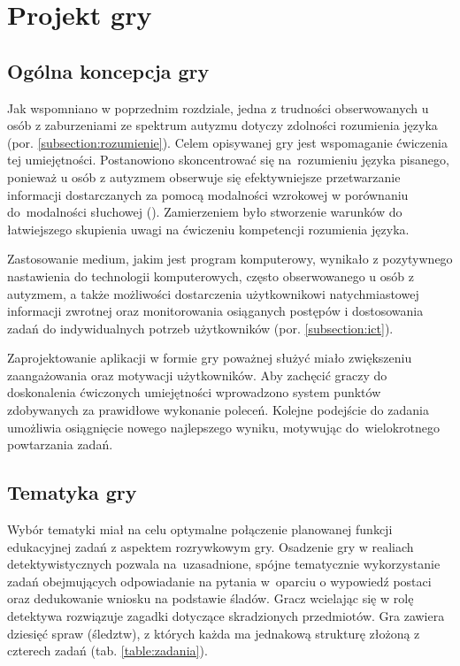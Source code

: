\chapter{Projekt gry}
\thispagestyle{firststyle}

\section{Ogólna koncepcja gry}

    Jak wspomniano w poprzednim rozdziale, jedna z trudności obserwowanych u osób z zaburzeniami ze spektrum autyzmu dotyczy zdolności rozumienia języka (por. \ref{subsection:rozumienie}).
    Celem opisywanej gry jest wspomaganie ćwiczenia tej umiejętności.
    Postanowiono skoncentrować się na~rozumieniu języka pisanego, ponieważ u osób z autyzmem obserwuje się efektywniejsze przetwarzanie informacji dostarczanych za pomocą modalności wzrokowej w porównaniu do~modalności słuchowej (\cite{quill1997instructional}).
    Zamierzeniem było stworzenie warunków do łatwiejszego skupienia uwagi na ćwiczeniu kompetencji rozumienia języka.
    
    Zastosowanie medium, jakim jest program komputerowy, wynikało z pozytywnego nastawienia do technologii komputerowych, często obserwowanego u osób z autyzmem, a także możliwości dostarczenia użytkownikowi natychmiastowej informacji zwrotnej oraz monitorowania osiąganych postępów i dostosowania zadań do indywidualnych potrzeb użytkowników (por. \ref{subsection:ict}).
    
    Zaprojektowanie aplikacji w formie gry poważnej służyć miało zwiększeniu zaangażowania oraz motywacji użytkowników.
    Aby zachęcić graczy do doskonalenia ćwiczonych umiejętności wprowadzono system punktów zdobywanych za prawidłowe wykonanie poleceń.
    Kolejne podejście do zadania umożliwia osiągnięcie nowego najlepszego wyniku, motywując do~wielokrotnego powtarzania zadań.

\section{Tematyka gry}

    Wybór tematyki miał na celu optymalne połączenie planowanej funkcji edukacyjnej zadań z aspektem rozrywkowym gry.
    Osadzenie gry w realiach detektywistycznych pozwala na~uzasadnione, spójne tematycznie wykorzystanie zadań obejmujących odpowiadanie na pytania w~oparciu o wypowiedź postaci oraz dedukowanie wniosku na podstawie śladów.
    Gracz wcielając się w rolę detektywa rozwiązuje zagadki dotyczące skradzionych przedmiotów.
    Gra zawiera dziesięć spraw (śledztw), z których każda ma jednakową strukturę złożoną z czterech zadań (tab. \ref{table:zadania}).
    
